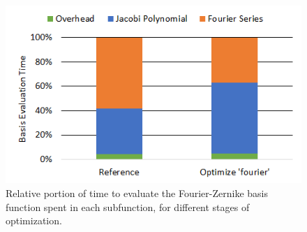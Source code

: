 \documentclass{article}
\begin{document}
%
\begin{figure}[H]
	\centering
	\includegraphics[width=0.6\linewidth,center]{./figs/compile_time_rel.png}
	\caption{Relative portion of time to evaluate the Fourier-Zernike basis function spent in each subfunction, for different stages of optimization.}
	\label{fig:compute_opt}
\end{figure}


\end{document}
